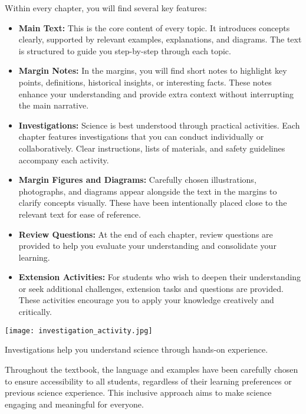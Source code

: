 Within every chapter, you will find several key features:

\begin{itemize}
    \item \textbf{Main Text:} This is the core content of every topic. It introduces concepts clearly, supported by relevant examples, explanations, and diagrams. The text is structured to guide you step-by-step through each topic.
    
    \item \textbf{Margin Notes:} In the margins, you will find short notes to highlight key points, definitions, historical insights, or interesting facts. These notes enhance your understanding and provide extra context without interrupting the main narrative.
    
    \item \textbf{Investigations:} Science is best understood through practical activities. Each chapter features investigations that you can conduct individually or collaboratively. Clear instructions, lists of materials, and safety guidelines accompany each activity.
    
    \item \textbf{Margin Figures and Diagrams:} Carefully chosen illustrations, photographs, and diagrams appear alongside the text in the margins to clarify concepts visually. These have been intentionally placed close to the relevant text for ease of reference.
    
    \item \textbf{Review Questions:} At the end of each chapter, review questions are provided to help you evaluate your understanding and consolidate your learning.
    
    \item \textbf{Extension Activities:} For students who wish to deepen their understanding or seek additional challenges, extension tasks and questions are provided. These activities encourage you to apply your knowledge creatively and critically.
\end{itemize}

\begin{marginfigure}[0pt]
    \texttt{[image: investigation\_activity.jpg]}
    \caption{Investigations help you understand science through hands-on experience.}
\end{marginfigure}

Throughout the textbook, the language and examples have been carefully chosen to ensure accessibility to all students, regardless of their learning preferences or previous science experience. This inclusive approach aims to make science engaging and meaningful for everyone.

